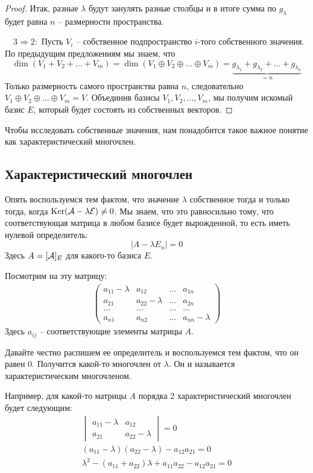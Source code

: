 \begin{proof}
    \quad Итак, разные $\lambda$ будут занулять разные столбцы и в итоге сумма по $g_\lambda$ будет равна $n$ -- размерности пространства.

    $\quad 3 \Rightarrow 2:$ Пусть $V_i$ -- собственное подпространство $i$-того собственного значения.
    По предыдущим предложениям мы знаем, что \[ \dim(V_1 + V_2 + \dots + V_m) 
    = \dim(V_1 \oplus V_2 \oplus \dots \oplus V_m)
    =  \underbrace{g_{\lambda_1} + g_{\lambda_2} + \dots + g_{\lambda_n}}_{ = n} \]
    \quad Только размерность самого пространства равна $n$, следовательно $V_1 \oplus V_2 \oplus \dots \oplus V_m = V$. 
    Объединив базисы $V_1, V_2, \dots, V_m$, мы получим искомый базис $E$, который будет состоять из собственных векторов.
\end{proof}

\vspace{5mm}

Чтобы исследовать собственные значения, нам понадобится такое важное понятие как характеристический многочлен.

\subsection{Характеристический многочлен}
Опять воспользуемся тем фактом, что значение $\lambda$ собственное тогда и только тогда, когда $\operatorname{Ker}(\mathcal{A} - \lambda\mathcal{E}) \neq 0$.
Мы знаем, что это равносильно тому, что соответствующая матрица в любом базисе будет вырожденной, то есть иметь нулевой определитель: \[ |A - \lambda E_n| = 0 \]
Здесь $A = [\mathcal{A}]_E$ для какого-то базиса $E$.

Посмотрим на эту матрицу:
\begin{gather*}
    \begin{pmatrix}
        a_{11} - \lambda & a_{12} & \dots & a_{1n} \\
        a_{21} & a_{22} - \lambda  & \dots & a_{2n} \\
        \dots & \dots & \dots & \dots \\
        a_{n1} & a_{n2} & \dots & a_{nn} - \lambda 
    \end{pmatrix}
\end{gather*}
Здесь $a_{ij}$ -- соответствующие элементы матрицы $A$.

Давайте честно распишем ее определитель и воспользуемся тем фактом, что он равен 0.
Получится какой-то многочлен от $\lambda$.
Он и называется характеристическим многочленом.

Например, для какой-то матрицы $A$ порядка 2 характеристический многочлен будет следующим:
\begin{gather*}
    \begin{vmatrix}
        a_{11} - \lambda & a_{12} \\
        a_{21} & a_{22} - \lambda
    \end{vmatrix} = 0 \\
    (a_{11} - \lambda)(a_{22} - \lambda) - a_{12}a_{21} = 0 \\
    \lambda^2 - (a_{11} + a_{22})\lambda + a_{11}a_{22} - a_{12}a_{21} = 0
\end{gather*}

